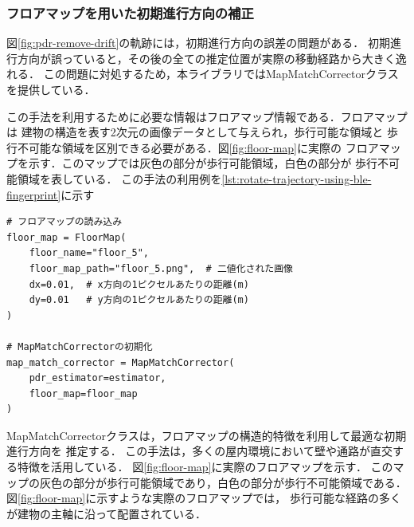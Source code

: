 

\subsubsection{フロアマップを用いた初期進行方向の補正}

図\ref{fig:pdr-remove-drift}の軌跡には，初期進行方向の誤差の問題がある．
初期進行方向が誤っていると，その後の全ての推定位置が実際の移動経路から大きく逸れる．
この問題に対処するため，本ライブラリではMapMatchCorrectorクラスを提供している．

この手法を利用するために必要な情報はフロアマップ情報である．フロアマップは
建物の構造を表す2次元の画像データとして与えられ，歩行可能な領域と
歩行不可能な領域を区別できる必要がある．図\ref{fig:floor-map}に実際の
フロアマップを示す．このマップでは灰色の部分が歩行可能領域，白色の部分が
歩行不可能領域を表している．
この手法の利用例を\ref{lst:rotate-trajectory-using-ble-fingerprint}に示す


\begin{lstlisting}[caption={MapMatchCorrectorの使用例},label=lst:rotate-trajectory-using-ble-fingerprint,float=ht]
# フロアマップの読み込み
floor_map = FloorMap(
    floor_name="floor_5",
    floor_map_path="floor_5.png",  # 二値化された画像
    dx=0.01,  # x方向の1ピクセルあたりの距離(m)
    dy=0.01   # y方向の1ピクセルあたりの距離(m)
)

# MapMatchCorrectorの初期化
map_match_corrector = MapMatchCorrector(
    pdr_estimator=estimator,
    floor_map=floor_map
)
\end{lstlisting}

MapMatchCorrectorクラスは，フロアマップの構造的特徴を利用して最適な初期進行方向を
推定する．
この手法は，多くの屋内環境において壁や通路が直交する特徴を活用している．
図\ref{fig:floor-map}に実際のフロアマップを示す．
このマップの灰色の部分が歩行可能領域であり，白色の部分が歩行不可能領域である．
図\ref{fig:floor-map}に示すような実際のフロアマップでは，
歩行可能な経路の多くが建物の主軸に沿って配置されている．

